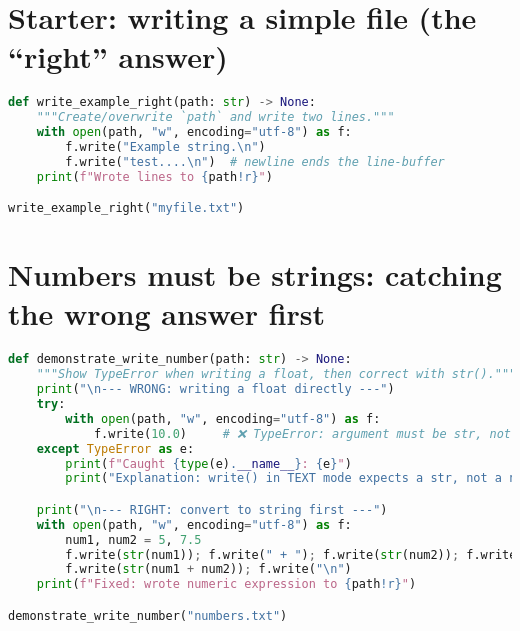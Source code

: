 \section{Starter: writing a simple file (the ``right'' answer)}
\begin{lstlisting}[language=Python, caption={Write two lines to a new file using "w".}]
def write_example_right(path: str) -> None:
    """Create/overwrite `path` and write two lines."""
    with open(path, "w", encoding="utf-8") as f:
        f.write("Example string.\n")
        f.write("test....\n")  # newline ends the line-buffer
    print(f"Wrote lines to {path!r}")

write_example_right("myfile.txt")
\end{lstlisting}

\section{Numbers must be strings: catching the wrong answer first}
\begin{lstlisting}[language=Python, caption={Demonstrate why f.write(10.0) is wrong, then fix.}]
def demonstrate_write_number(path: str) -> None:
    """Show TypeError when writing a float, then correct with str()."""
    print("\n--- WRONG: writing a float directly ---")
    try:
        with open(path, "w", encoding="utf-8") as f:
            f.write(10.0)     # ❌ TypeError: argument must be str, not float
    except TypeError as e:
        print(f"Caught {type(e).__name__}: {e}")
        print("Explanation: write() in TEXT mode expects a str, not a number.")

    print("\n--- RIGHT: convert to string first ---")
    with open(path, "w", encoding="utf-8") as f:
        num1, num2 = 5, 7.5
        f.write(str(num1)); f.write(" + "); f.write(str(num2)); f.write(" = ")
        f.write(str(num1 + num2)); f.write("\n")
    print(f"Fixed: wrote numeric expression to {path!r}")

demonstrate_write_number("numbers.txt")
\end{lstlisting}

